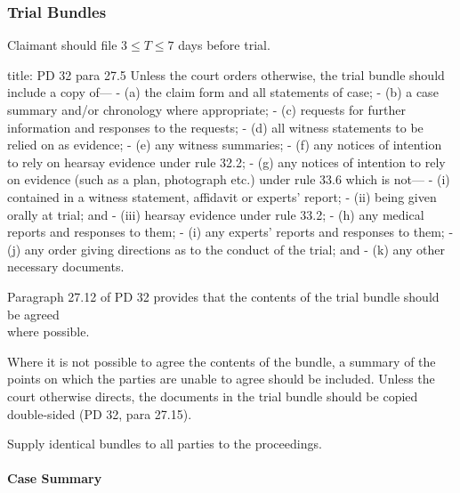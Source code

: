 \documentclass[
]{article}
\newenvironment{Shaded}{}{}
\newcommand{\NormalTok}[1]{#1}
\begin{document}
\hypertarget{trial-bundles}{%
\subsubsection{Trial Bundles}\label{trial-bundles}}

Claimant should file \(3 \leq T \leq 7\) days before trial.

\begin{Shaded}
\begin{Highlighting}[]
\NormalTok{title: PD 32 para 27.5}
\NormalTok{Unless the court orders otherwise, the trial bundle should include a copy of—}
\NormalTok{{-} (a) the claim form and all statements of case;}
\NormalTok{{-} (b) a case summary and/or chronology where appropriate;}
\NormalTok{{-} (c) requests for further information and responses to the requests;}
\NormalTok{{-} (d) all witness statements to be relied on as evidence;}
\NormalTok{{-} (e) any witness summaries;}
\NormalTok{{-} (f) any notices of intention to rely on hearsay evidence under rule 32.2;}
\NormalTok{{-} (g) any notices of intention to rely on evidence (such as a plan, photograph etc.) under rule 33.6 which is not—}
\NormalTok{    {-} (i) contained in a witness statement, affidavit or experts’ report;}
\NormalTok{    {-} (ii) being given orally at trial; and}
\NormalTok{    {-} (iii) hearsay evidence under rule 33.2;}
\NormalTok{{-} (h) any medical reports and responses to them;}
\NormalTok{{-} (i) any experts’ reports and responses to them;}
\NormalTok{{-} (j) any order giving directions as to the conduct of the trial; and}
\NormalTok{{-} (k) any other necessary documents.}
\end{Highlighting}
\end{Shaded}

Paragraph 27.12 of PD 32 provides that the contents of the trial bundle
should be agreed\\
where possible.

Where it is not possible to agree the contents of the bundle, a summary
of the points on which the parties are unable to agree should be
included. Unless the court otherwise directs, the documents in the trial
bundle should be copied double-sided (PD 32, para 27.15).

Supply identical bundles to all parties to the proceedings.

\hypertarget{case-summary}{%
\paragraph{Case Summary}\label{case-summary}}
\end{document}
